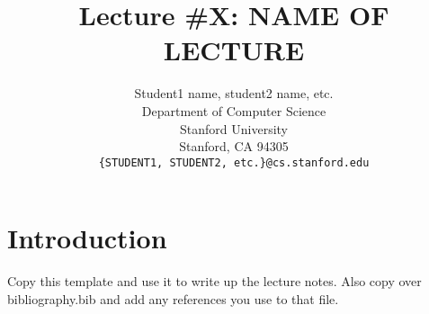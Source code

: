 \documentclass{article}
\title{Lecture \#X: NAME OF LECTURE}
\author{
  Student1 name, student2 name, etc. \\
  Department of Computer Science\\
  Stanford University\\
  Stanford, CA 94305 \\
  \texttt{\{STUDENT1, STUDENT2, etc.\}@cs.stanford.edu} \\
}
\begin{document}
\maketitle


\section{Introduction}
Copy this template and use it to write up the lecture notes. Also copy over
bibliography.bib and add any references you use to that file.

\small


\end{document}
